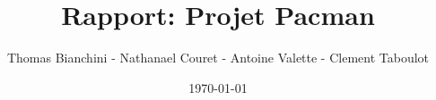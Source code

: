 \documentclass{article}
\author{Thomas Bianchini - Nathanael Couret - Antoine Valette - Clement Taboulot}
\title{Rapport: \linebreak Projet Pacman}
\date{\today}
\begin{document}
\maketitle

\pagebreak

\tableofcontents

\pagebreak






\end{document}
